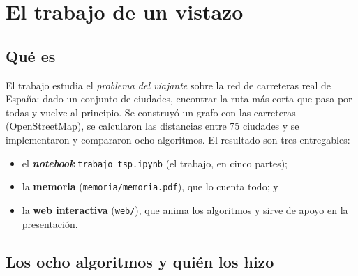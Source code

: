 \documentclass[11pt,a4paper,twoside,openany]{report}
\begin{document}
\tableofcontents
{}

\chapter{El trabajo de un vistazo}\label{g:repo}

\section{Qué es}

El trabajo estudia el \emph{problema del viajante} sobre la red de carreteras real de España: dado un conjunto de ciudades, encontrar la ruta más corta que pasa por todas y vuelve al principio. Se construyó un grafo con las carreteras
(OpenStreetMap), se calcularon las distancias entre 75 ciudades y se implementaron y compararon ocho algoritmos. El resultado son tres entregables:
\begin{itemize}
  \item el \textbf{\emph{notebook}} \texttt{trabajo\_tsp.ipynb} (el trabajo, en cinco partes);
  \item la \textbf{memoria} (\texttt{memoria/memoria.pdf}), que lo cuenta todo; y
  \item la \textbf{web interactiva} (\texttt{web/}), que anima los algoritmos y sirve de apoyo en la presentación.
\end{itemize}

\section{Los ocho algoritmos y quién los hizo}
\end{document}

